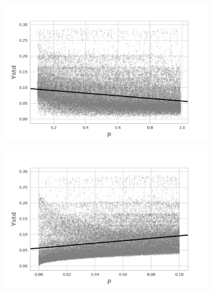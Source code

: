 \begin{figure}[h]
    \begin{subfigure}[b]{0.49\textwidth}
        \includegraphics[width=\textwidth]{ims/mutoregressions/regressionmutatingop.png}
      \end{subfigure}
          \begin{subfigure}[b]{0.49\textwidth}
            \includegraphics[width=\textwidth]{ims/mutoregressions/regressionmutatingorho.png}
      \end{subfigure}


\end{figure}
